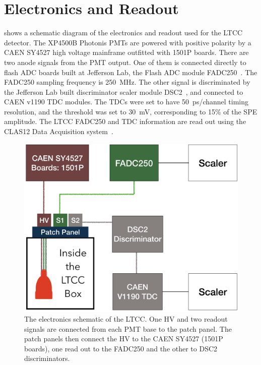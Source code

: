 \section{Electronics and Readout}

 shows a schematic diagram of the electronics and readout used for the LTCC detector.
The XP4500B Photonis PMTs are powered with positive polarity by a CAEN SY4527 high voltage mainframe
outfitted with 1501P boards. There are two anode signals from the PMT output. One of them is connected directly
to flash ADC boards built at Jefferson Lab, the Flash ADC module FADC250~\cite{daq-nim}. The FADC250
sampling frequency is 250~MHz. The other signal is discriminated by the Jefferson Lab built discriminator
scaler module DSC2~\cite{daq-nim}, and connected to CAEN v1190 TDC modules. The TDCs were set to have
50~ps/channel timing resolution, and the threshold was set to 30~mV, corresponding to 15\% of the SPE amplitude.
The LTCC FADC250 and TDC information are read out using the CLAS12 Data Acquisition system~\cite{daq-nim}.

\begin{figure}
	\centering
	\includegraphics[width=0.99\columnwidth,keepaspectratio]{img/electronicScheme.png}
	\caption{The electronics schematic of the LTCC. One HV and two readout signals are connected from each PMT
          base to the patch panel. The patch panels then connect the HV to the CAEN SY4527 (1501P boards), one
          read out to the FADC250 and the other to DSC2 discriminators.}
	\label{fig:electronicScheme}
\end{figure}

